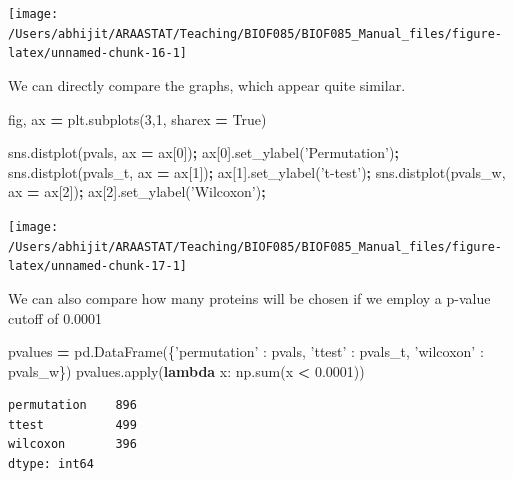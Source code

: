 \documentclass[
  letterpaper,
]{scrbook}
\newenvironment{Shaded}{\begin{snugshade}}{\end{snugshade}}
\newcommand{\BuiltInTok}[1]{#1}
\newcommand{\DecValTok}[1]{\textcolor[rgb]{0.00,0.00,0.81}{#1}}
\newcommand{\FloatTok}[1]{\textcolor[rgb]{0.00,0.00,0.81}{#1}}
\newcommand{\KeywordTok}[1]{\textcolor[rgb]{0.13,0.29,0.53}{\textbf{#1}}}
\newcommand{\NormalTok}[1]{#1}
\newcommand{\OperatorTok}[1]{\textcolor[rgb]{0.81,0.36,0.00}{\textbf{#1}}}
\newcommand{\StringTok}[1]{\textcolor[rgb]{0.31,0.60,0.02}{#1}}
\newcommand{\VariableTok}[1]{\textcolor[rgb]{0.00,0.00,0.00}{#1}}
\begin{document}
\begin{center}\texttt{[image: /Users/abhijit/ARAASTAT/Teaching/BIOF085/BIOF085\_Manual\_files/figure-latex/unnamed-chunk-16-1]} \end{center}

We can directly compare the graphs, which appear quite similar.

\begin{Shaded}
\begin{Highlighting}[]
\NormalTok{fig, ax }\OperatorTok{=}\NormalTok{ plt.subplots(}\DecValTok{3}\NormalTok{,}\DecValTok{1}\NormalTok{, sharex }\OperatorTok{=} \VariableTok{True}\NormalTok{)}

\NormalTok{sns.distplot(pvals, ax }\OperatorTok{=}\NormalTok{ ax[}\DecValTok{0}\NormalTok{])}\OperatorTok{;}\NormalTok{ ax[}\DecValTok{0}\NormalTok{].set_ylabel(}\StringTok{'Permutation'}\NormalTok{)}\OperatorTok{;}
\NormalTok{sns.distplot(pvals_t, ax }\OperatorTok{=}\NormalTok{ ax[}\DecValTok{1}\NormalTok{])}\OperatorTok{;}\NormalTok{ ax[}\DecValTok{1}\NormalTok{].set_ylabel(}\StringTok{'t-test'}\NormalTok{)}\OperatorTok{;}
\NormalTok{sns.distplot(pvals_w, ax }\OperatorTok{=}\NormalTok{ ax[}\DecValTok{2}\NormalTok{])}\OperatorTok{;}\NormalTok{ ax[}\DecValTok{2}\NormalTok{].set_ylabel(}\StringTok{'Wilcoxon'}\NormalTok{)}\OperatorTok{;}
\end{Highlighting}
\end{Shaded}

\begin{center}\texttt{[image: /Users/abhijit/ARAASTAT/Teaching/BIOF085/BIOF085\_Manual\_files/figure-latex/unnamed-chunk-17-1]} \end{center}

We can also compare how many proteins will be chosen if we employ a p-value cutoff of 0.0001

\begin{Shaded}
\begin{Highlighting}[]
\NormalTok{pvalues }\OperatorTok{=}\NormalTok{ pd.DataFrame(\{}\StringTok{'permutation'}\NormalTok{ : pvals, }\StringTok{'ttest'}\NormalTok{ : pvals_t,}
                           \StringTok{'wilcoxon'}\NormalTok{ : pvals_w\})}
\NormalTok{pvalues.}\BuiltInTok{apply}\NormalTok{(}\KeywordTok{lambda}\NormalTok{ x: np.}\BuiltInTok{sum}\NormalTok{(x }\OperatorTok{<} \FloatTok{0.0001}\NormalTok{))}
\end{Highlighting}
\end{Shaded}

\begin{verbatim}
permutation    896
ttest          499
wilcoxon       396
dtype: int64
\end{verbatim}
\end{document}
